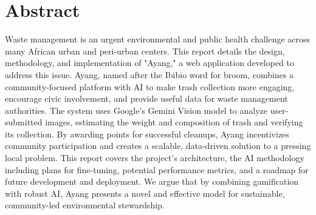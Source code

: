 \thispagestyle{plain}




\chapter*{Abstract}

{
Waste management is an urgent environmental and public health challenge across many African urban and peri-urban centers. This report details the design, methodology, and implementation of "Ayang," a web application developed to address this issue. Ayang, named after the Ibibio word for broom, combines a community-focused platform with AI to make trash collection more engaging, encourage civic involvement, and provide useful data for waste management authorities. The system uses Google's Gemini Vision model to analyze user-submitted images, estimating the weight and composition of trash and verifying its collection. By awarding points for successful cleanups, Ayang incentivizes community participation and creates a scalable, data-driven solution to a pressing local problem. This report covers the project's architecture, the AI methodology including plans for fine-tuning, potential performance metrics, and a roadmap for future development and deployment. We argue that by combining gamification with robust AI, Ayang presents a novel and effective model for sustainable, community-led environmental stewardship.}



